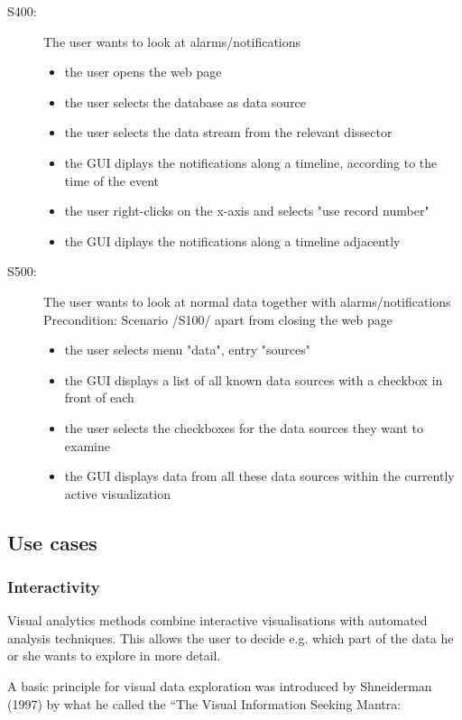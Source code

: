 \documentclass[twoside, english, draft]{Pflichtenheft}
\begin{document}
\begin{description}
\item[S400:] The user wants to look at alarms/notifications
\begin{itemize}
\item{the user opens the web page}
\item{the user selects the database as data source}
\item{the user selects the data stream from the relevant dissector}
\item{the GUI diplays the notifications along a timeline, according to the time of the event}
\item{the user right-clicks on the x-axis and selects "use record number"}
\item{the GUI diplays the notifications along a timeline adjacently}
\end{itemize}



\item[S500:] The user wants to look at normal data together with alarms/notifications
\\
Precondition: Scenario /S100/ apart from closing the web page
\begin{itemize}
\item{the user selects menu "data", entry "sources"}
\item{the GUI displays a list of all known data sources with a checkbox in front of each}
\item{the user selects the checkboxes for the data sources they want to examine}
\item{the GUI displays data from all these data sources within the currently active visualization}
\end{itemize}


\end{description}

\subsection{Use cases}
\subsubsection{Interactivity}


Visual analytics methods combine interactive visualisations with automated analysis
techniques. This allows the user to decide e.g. which part
of the data he or she wants to explore in more detail.

 A basic principle for visual data exploration was introduced by Shneiderman (1997) by what he called the “The
Visual Information Seeking Mantra: 
\end{document}

